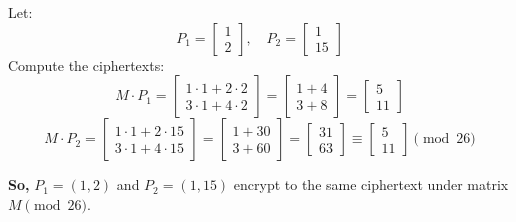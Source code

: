 \documentclass[12pt]{article}
\begin{document}
Let:
\[
P_1 = \begin{bmatrix}
1 \\
2
\end{bmatrix}, \quad
P_2 = \begin{bmatrix}
1 \\
15
\end{bmatrix}
\]
Compute the ciphertexts:
\[
M \cdot P_1 = \begin{bmatrix}
1 \cdot 1 + 2 \cdot 2 \\
3 \cdot 1 + 4 \cdot 2
\end{bmatrix}
= \begin{bmatrix}
1 + 4 \\
3 + 8
\end{bmatrix}
= \begin{bmatrix}
5 \\
11
\end{bmatrix}
\]
\[
M \cdot P_2 = \begin{bmatrix}
1 \cdot 1 + 2 \cdot 15 \\
3 \cdot 1 + 4 \cdot 15
\end{bmatrix}
= \begin{bmatrix}
1 + 30 \\
3 + 60
\end{bmatrix}
= \begin{bmatrix}
31 \\
63
\end{bmatrix}
\equiv
\begin{bmatrix}
5 \\
11
\end{bmatrix}
\pmod{26}
\]

\textbf{So,} \( P_1 = (1, 2) \) and \( P_2 = (1, 15) \) encrypt to the same ciphertext under matrix \( M \pmod{26} \).
\end{document}
